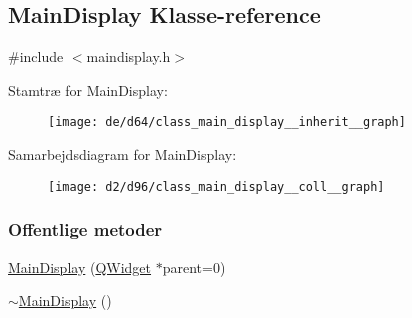 \hypertarget{class_main_display}{}\subsection{Main\+Display Klasse-\/reference}
\label{class_main_display}


{\ttfamily \#include $<$maindisplay.\+h$>$}



Stamtræ for Main\+Display\+:\nopagebreak
\begin{figure}[H]
\begin{center}
\leavevmode
\texttt{[image: de/d64/class\_main\_display\_\_inherit\_\_graph]}
\end{center}
\end{figure}


Samarbejdsdiagram for Main\+Display\+:\nopagebreak
\begin{figure}[H]
\begin{center}
\leavevmode
\texttt{[image: d2/d96/class\_main\_display\_\_coll\_\_graph]}
\end{center}
\end{figure}
\subsubsection*{Offentlige metoder}
\begin{DoxyCompactItemize}
\item 
\hyperlink{class_main_display_a1b926c0907b4f58bf39a7192278aa28f}{Main\+Display} (\hyperlink{class_q_widget}{Q\+Widget} $\ast$parent=0)
\item 
\hyperlink{class_main_display_acc33b95d402516e0045bdff383c85d61}{$\sim$\+Main\+Display} ()
\end{DoxyCompactItemize}

